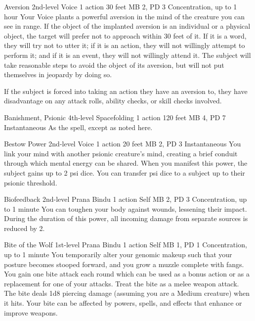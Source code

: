 \DndPowerHeader%
  {Aversion}
  {2nd-level Voice}
  {1 action}
  {30 feet}
  {MB 2, PD 3}
  {Concentration, up to 1 hour}
Your Voice plants a powerful aversion in the mind of the creature
you can see in range.
If the object of the implanted aversion is an individual
or a physical object,
the target will prefer not to approach within 30 feet of it.
If it is a word,
they will try not to utter it;
if it is an action,
they will not willingly attempt to perform it;
and if it is an event,
they will not willingly attend it.
The subject will take reasonable steps to avoid the object of its aversion,
but will not put themselves in jeopardy by doing so.

If the subject is forced into taking an action they have an aversion to,
they have disadvantage on any attack rolls,
ability checks,
or skill checks involved.

\DndPowerHeader%
  {Banishment, Psionic}
  {4th-level Spacefolding}
  {1 action}
  {120 feet}
  {MB 4, PD 7}
  {Instantaneous}
As the  spell, except as noted here.

\DndPowerHeader%
  {Bestow Power}
  {2nd-level Voice}
  {1 action}
  {20 feet}
  {MB 2, PD 3}
  {Instantaneous}
You link your mind with another psionic creature's mind,
creating a brief conduit through which mental energy can be shared.
When you manifest this power,
the subject gains up to 2 psi dice.
You can transfer psi dice to a subject up to their psionic threshold.

\DndPowerHeader%
  {Biofeedback}
  {2nd-level Prana Bindu}
  {1 action}
  {Self}
  {MB 2, PD 3}
  {Concentration, up to 1 minute}
    You can toughen your body against wounds,
    lessening their impact.
    During the duration of this power, all incoming damage
    from separate sources is reduced by 2.

\DndPowerHeader%
  {Bite of the Wolf}
  {1st-level Prana Bindu}
  {1 action}
  {Self}
  {MB 1, PD 1}
  {Concentration, up to 1 minute}
  You temporarily alter your genomic makeup
  such that your posture becomes stooped forward,
  and you grow a muzzle complete with fangs.
  You gain one bite attack each round which
  can be used as a bonus action or as a replacement
  for one of your attacks.
  Treat the bite as a melee weapon attack.
  The bite deals 1d8 piercing damage
  (assuming you are a Medium creature)
  when it hits.
  Your bite can be affected by
  powers, spells, and effects
  that enhance or improve weapons.
  

